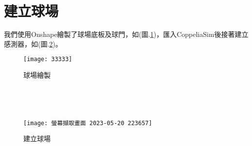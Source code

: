 \section{建立球場}
我們使用Onshape繪製了球場底板及球門，如(圖.\ref{球場繪製})，匯入CoppeliaSim後接著建立感測器，如(圖.\ref{建立球場})。\
\begin{figure}[hbt!]
\begin{center}
\texttt{[image: 33333]}
\caption{\Large 球場繪製}\label{球場繪製}
\end{center}
\end{figure}\
\begin{figure}[hbt!]
\begin{center}
\end{center}
\end{figure}\
\begin{figure}[hbt!]
\begin{center}
\texttt{[image: 螢幕擷取畫面 2023-05-20 223657]}
\caption{\Large 建立球場}\label{建立球場}
\end{center}
\end{figure}\
\newpage

